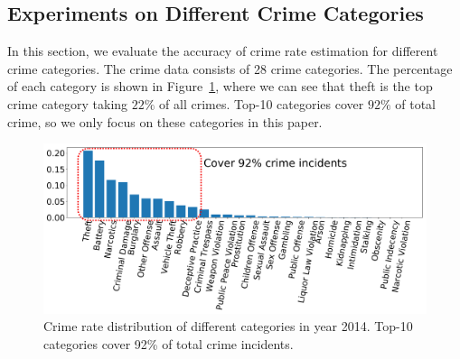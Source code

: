 
\subsection{Experiments on Different Crime Categories}
\label{sec:crime-cat}
In this section, we evaluate the accuracy of crime rate estimation for different crime categories. The crime data consists of 28 crime categories. The percentage of each category is shown in Figure~\ref{fig:cate_rate}, where we can see that theft is the top crime category taking $22\%$ of all crimes. Top-10 categories cover $92\%$ of total crime, so we only focus on these categories in this paper.

\begin{figure}[t!]
	\centering
	\includegraphics[width=\linewidth]{fig/cate_rate.pdf}
	\caption{Crime rate distribution of different categories in year 2014. Top-10 categories cover 92\% of total crime incidents.}
	\label{fig:cate_rate}
\vspace{-3mm}
\end{figure}


